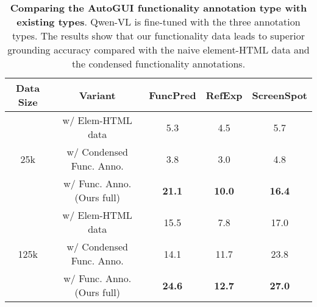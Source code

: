 
\begin{table}[]
\centering
\footnotesize
\caption{\textbf{Comparing the AutoGUI functionality annotation type with existing types}. Qwen-VL is fine-tuned with the three annotation types. The results show that our functionality data leads to superior grounding accuracy compared with the naive element-HTML data and the condensed functionality annotations.}
\label{tab:ablation}
\begin{tabular}{@{}ccccc@{}}
\toprule
Data Size             & Variant          & FuncPred & RefExp & ScreenSpot \\ \midrule
\multirow{3}{*}{25k}  & w/ Elem-HTML data     &  5.3      &  4.5   &    5.7     \\
                      & w/ Condensed Func. Anno.     &  3.8   &  3.0  &   4.8      \\
                      & w/ Func. Anno. (Ours full)         &    \textbf{21.1}    &   \textbf{10.0}   &   \textbf{16.4}    \\ \midrule
\multirow{3}{*}{125k} & w/ Elem-HTML data     &  15.5   &  7.8  &   17.0      \\
                      & w/ Condensed Func. Anno.     &  14.1   &  11.7  &   23.8      \\
                      & w/ Func. Anno. (Ours full)         &  \textbf{24.6}   &  \textbf{12.7}  &   \textbf{27.0}    \\ \bottomrule
\end{tabular}
\end{table}
